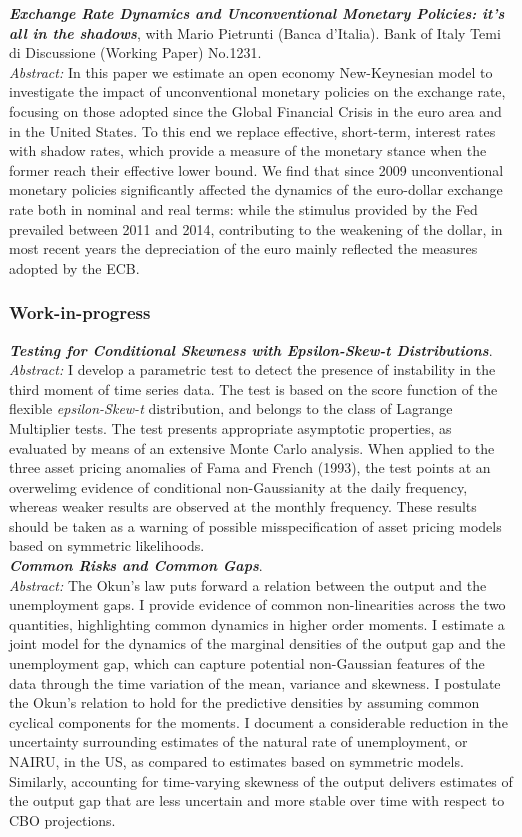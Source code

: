 \documentclass[a4paper,12pt]{article}
\begin{document}
\textit{\textbf{Exchange Rate Dynamics and Unconventional Monetary Policies: it’s all in the shadows}}, with Mario Pietrunti (Banca d'Italia). Bank of Italy Temi di Discussione (Working Paper) No.1231.\\[.5em]
\textit{Abstract:} In this paper we estimate an open economy New-Keynesian model to investigate the impact of unconventional monetary policies on the exchange rate, focusing on those adopted since the Global Financial Crisis in the euro area and in the United States. To this end we replace effective, short-term, interest rates with shadow rates, which provide a measure of the monetary stance when the former reach their effective lower bound. We find that since 2009 unconventional monetary policies significantly affected the dynamics of the euro-dollar exchange rate both in nominal and real terms: while the stimulus provided by the Fed prevailed between 2011 and 2014, contributing to the weakening of the dollar, in most recent years the depreciation of the euro mainly reflected the measures adopted by the ECB.
\subsubsection*{Work-in-progress}
\textit{\textbf{Testing for Conditional Skewness with Epsilon-Skew-t Distributions}}.\\[.5em]
\textit{Abstract:} I develop a parametric test to detect the presence of instability in the third moment of time series data. The test is based on the score function of the flexible \textit{epsilon-Skew-t} distribution, and belongs to the class of Lagrange Multiplier tests. The test presents appropriate asymptotic properties, as evaluated by means of an extensive Monte Carlo analysis. When applied to the three asset pricing anomalies of Fama and French (1993), the test points at an overwelimg evidence of conditional non-Gaussianity at the daily frequency, whereas weaker results are observed at the monthly frequency. These results should be taken as a warning of possible misspecification of asset pricing models based on symmetric likelihoods. \\[.5em]

\textit{\textbf{Common Risks and Common Gaps}}.\\[.5em]
\textit{Abstract:} The Okun's law puts forward a relation between the output and the unemployment gaps. I provide evidence of common non-linearities across the two quantities, highlighting common dynamics in higher order moments. I estimate a joint model for the dynamics of the marginal densities of the output gap and the unemployment gap, which can capture potential non-Gaussian features of the data through the time variation of the mean, variance and skewness. I postulate the Okun's relation to hold for the predictive densities by assuming common cyclical components for the moments. I document a considerable reduction in the uncertainty surrounding estimates of the natural rate of unemployment, or NAIRU, in the US, as compared to estimates based on symmetric models. Similarly, accounting for time-varying skewness of the output delivers estimates of the output gap that are less uncertain and more stable over time with respect to CBO projections.\\[.5em]
\end{document}

